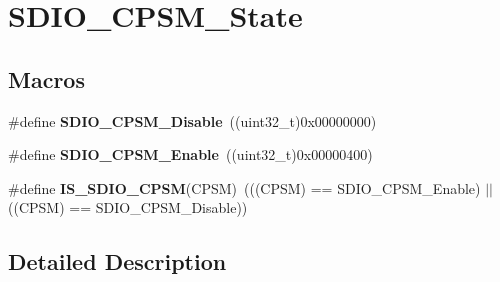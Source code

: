 \hypertarget{group___s_d_i_o___c_p_s_m___state}{\section{S\-D\-I\-O\-\_\-\-C\-P\-S\-M\-\_\-\-State}
\label{group___s_d_i_o___c_p_s_m___state}
}
\subsection*{Macros}
\begin{DoxyCompactItemize}
\item 
\hypertarget{group___s_d_i_o___c_p_s_m___state_ga996751273ad238e255a740f7c2844c6c}{\#define {\bfseries S\-D\-I\-O\-\_\-\-C\-P\-S\-M\-\_\-\-Disable}~((uint32\-\_\-t)0x00000000)}\label{group___s_d_i_o___c_p_s_m___state_ga996751273ad238e255a740f7c2844c6c}

\item 
\hypertarget{group___s_d_i_o___c_p_s_m___state_gad437cefe89d6175aa074a1c40b909ebc}{\#define {\bfseries S\-D\-I\-O\-\_\-\-C\-P\-S\-M\-\_\-\-Enable}~((uint32\-\_\-t)0x00000400)}\label{group___s_d_i_o___c_p_s_m___state_gad437cefe89d6175aa074a1c40b909ebc}

\item 
\hypertarget{group___s_d_i_o___c_p_s_m___state_ga58cf04903dab015106e4e0937bef443b}{\#define {\bfseries I\-S\-\_\-\-S\-D\-I\-O\-\_\-\-C\-P\-S\-M}(C\-P\-S\-M)~(((C\-P\-S\-M) == S\-D\-I\-O\-\_\-\-C\-P\-S\-M\-\_\-\-Enable) $|$$|$ ((C\-P\-S\-M) == S\-D\-I\-O\-\_\-\-C\-P\-S\-M\-\_\-\-Disable))}\label{group___s_d_i_o___c_p_s_m___state_ga58cf04903dab015106e4e0937bef443b}

\end{DoxyCompactItemize}


\subsection{Detailed Description}
